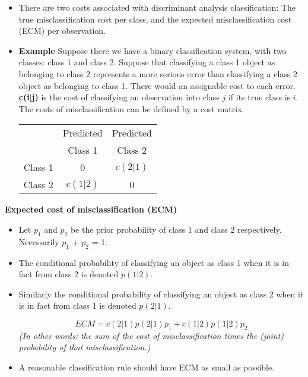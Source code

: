 \begin{itemize}
	\item 	There are two costs associated with discriminant analysis classification: The true misclassification cost per class, and the expected misclassification cost (ECM) per observation.
	
	\item 	\textbf{Example} Suppose there we have a binary classification system, with two classes: class 1 and class 2.
	Suppose that classifying a class 1 object as belonging to class 2 represents a more serious error than classifying a class 2 object as belonging to class 1. There would an assignable cost to each error.
	\textbf{c(i$|$j)} is the cost of classifying an observation into class $j$ if its true class is $i$.
	The costs of misclassification can be defined by a cost matrix.
	
	\begin{center}
	\begin{tabular}{|c|c|c|}
		\hline
		& Predicted & Predicted \\
		& Class 1 & Class 2 \\  \hline
		Class 1 & 0 & $c(2|1)$  \\ \hline
		Class 2 & $c(1|2)$ & 0 \\
		\hline
	\end{tabular}
	\end{center}
	
\end{itemize}

\noindent \textbf{Expected cost of misclassification (ECM)}
\begin{itemize}
	\item Let $p_1$ and $p_2$ be the prior probability of class 1 and class 2 respectively.
	Necessarily $p_1$ + $p_2$ = 1.
	
\item	The conditional probability of classifying an object as class 1 when it is in fact from
	class 2 is denoted $p(1|2)$.
\item 	Similarly the conditional probability of classifying an object as class 2 when it is in
	fact from class 1 is denoted $p(2|1)$.
	
	\[ECM = c(2|1)p(2|1)p_1 + c(1|2)p(1|2)p_2\]
\textit{(In other words: the sum of the cost of misclassification times the (joint) probability of that misclassification.)}
	
\item 	A reasonable classification rule should have ECM as small as possible.
\end{itemize}





